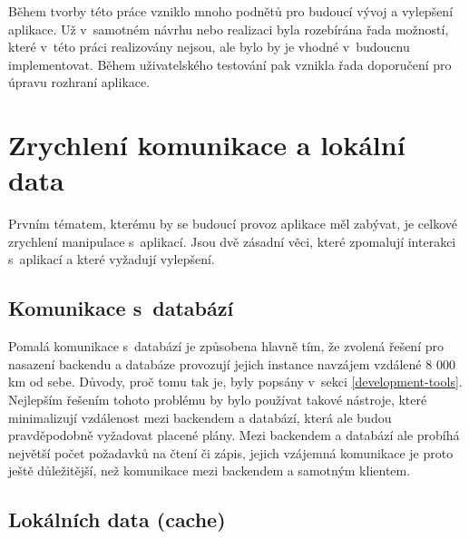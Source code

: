 Během tvorby této práce vzniklo mnoho podnětů pro budoucí vývoj a vylepšení aplikace. Už v~samotném návrhu nebo realizaci byla rozebírána řada možností, které v~této práci realizovány nejsou, ale bylo by je vhodné v~budoucnu implementovat. Během uživatelského testování pak vznikla řada doporučení pro úpravu rozhraní aplikace.

\section{Zrychlení komunikace a lokální data}

Prvním tématem, kterému by se budoucí provoz aplikace měl zabývat, je celkové zrychlení manipulace s~aplikací. Jsou dvě zásadní věci, které zpomalují interakci s~aplikací a které vyžadují vylepšení.

\subsection{Komunikace s~databází}

Pomalá komunikace s~databází je způsobena hlavně tím, že zvolená řešení pro nasazení backendu a databáze provozují jejich instance navzájem vzdálené 8 000 km od sebe. Důvody, proč tomu tak je, byly popsány v~sekci \ref{development-tools}. Nejlepším řešením tohoto problému by bylo používat takové nástroje, které minimalizují vzdálenost mezi backendem a databází, která ale budou pravděpodobně vyžadovat placené plány. Mezi backendem a databází ale probíhá největší počet požadavků na čtení či zápis, jejich vzájemná komunikace je proto ještě důležitější, než komunikace mezi backendem a samotným klientem.

\subsection{Lokálních data (cache)}


